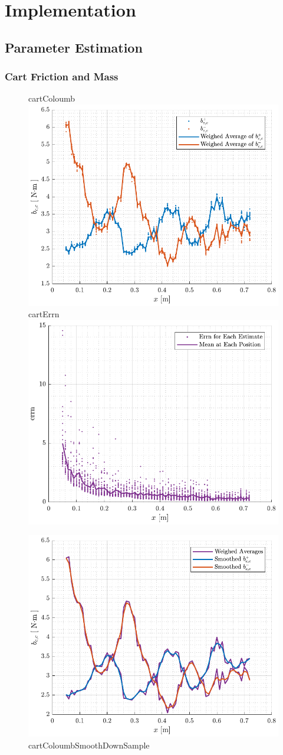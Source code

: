 \chapter{Implementation}


\section{Parameter Estimation}

\subsection{Cart Friction and Mass}

\begin{figure}[H]
  \hspace{1cm}
  \captionbox
  {
    cartColoumb
    \label{fig:cartColoumb}
  }
  {
    \hspace{-1cm}
    \includegraphics[width=.45\textwidth]{figures/cartColoumb}
  }
  \hspace{20pt}
  \captionbox 
  {
    cartErrn
    \label{fig:cartErrn}
  }
  {
    \hspace{-1cm}
    \includegraphics[width=.45\textwidth]{figures/cartErrn}
  }  
\end{figure}

\begin{figure}[H]
  \includegraphics[width=.42\textwidth]{figures/cartColoumbSmoothDownSample}
  \caption{cartColoumbSmoothDownSample}
  \label{fig:cartColoumbSmoothDownSample}
\end{figure}



